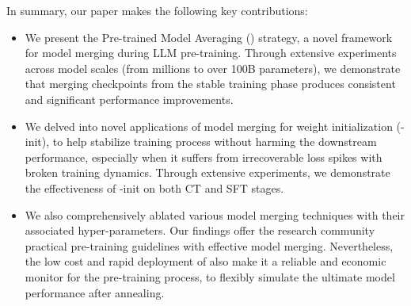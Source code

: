 

In summary, our paper makes the following key contributions:
\begin{itemize}
    \item We present the Pre-trained Model Averaging (\OURS{}) strategy, a novel framework for model merging during LLM pre-training.
    Through extensive experiments across model scales (from millions to over 100B parameters),
    we demonstrate that merging checkpoints from the stable training phase produces consistent and significant performance improvements.
    \item We delved into novel applications of model merging for weight initialization (\OURS-init), to help stabilize training process without harming the downstream performance, especially when it suffers from irrecoverable loss spikes with broken training dynamics.
    Through extensive experiments, we demonstrate the effectiveness of \OURS{}-init on both CT and SFT stages.
    \item We also comprehensively ablated various model merging techniques with their associated hyper-parameters. Our findings offer the research community practical pre-training guidelines with effective model merging.
    Nevertheless, the low cost and rapid deployment of \OURS{} also make it a reliable and economic monitor for the pre-training process, to flexibly simulate the ultimate model performance after annealing.

\end{itemize}


